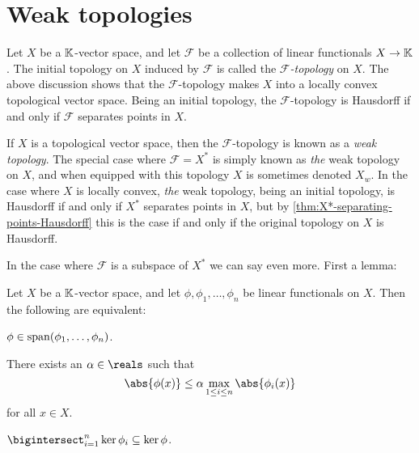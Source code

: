 \documentclass[article, a4paper, 11pt, oneside]{memoir}
\numberwithin{equation}{chapter}
\newcommand{\calF}{\mathcal{F}}
\begin{document}
\section{Weak topologies}

Let $X$ be a $\mathbb{K}$-vector space, and let $\calF$ be a collection of linear functionals $X \to \mathbb{K}$. The initial topology on $X$ induced by $\calF$ is called the \emph{$\calF$-topology} on $X$. The above discussion shows that the $\calF$-topology makes $X$ into a locally convex topological vector space. Being an initial topology, the $\calF$-topology is Hausdorff if and only if $\calF$ separates points in $X$.

If $X$ is a topological vector space, then the $\calF$-topology is known as a \emph{weak topology}. The special case where $\calF = X^*$ is simply known as \emph{the} weak topology on $X$, and when equipped with this topology $X$ is sometimes denoted $X_w$. In the case where $X$ is locally convex, \emph{the} weak topology, being an initial topology, is Hausdorff if and only if $X^*$ separates points in $X$, but by \cref{thm:X*-separating-points-Hausdorff} this is the case if and only if the original topology on $X$ is Hausdorff.

In the case where $\calF$ is a subspace of $X^*$ we can say even more. First a lemma:

\begin{lemma}
    \label{thm:linear-functional-span-lemma}
    Let $X$ be a $\mathbb{K}$-vector space, and let $\phi, \phi_1, \ldots, \phi_n$ be linear functionals on $X$. Then the following are equivalent:
    \begin{enumlem}
        \item \label{enum:linear-functional-span-lemma-span} $\phi \in \operatorname{span}(\phi_1, \ldots, \phi_n)$.
        
        \item \label{enum:linear-functional-span-lemma-bounded} There exists an $\alpha \in \reals$ such that
        \begin{equation*}
            \abs{\phi(x)}
                \leq \alpha \max_{1 \leq i \leq n} \abs{\phi_i(x)}
        \end{equation*}
        for all $x \in X$.

        \item \label{enum:linear-functional-span-lemma-kernel} $\bigintersect_{i=1}^n \ker\phi_i \subseteq \ker\phi$.
    \end{enumlem}
\end{lemma}
\end{document}
